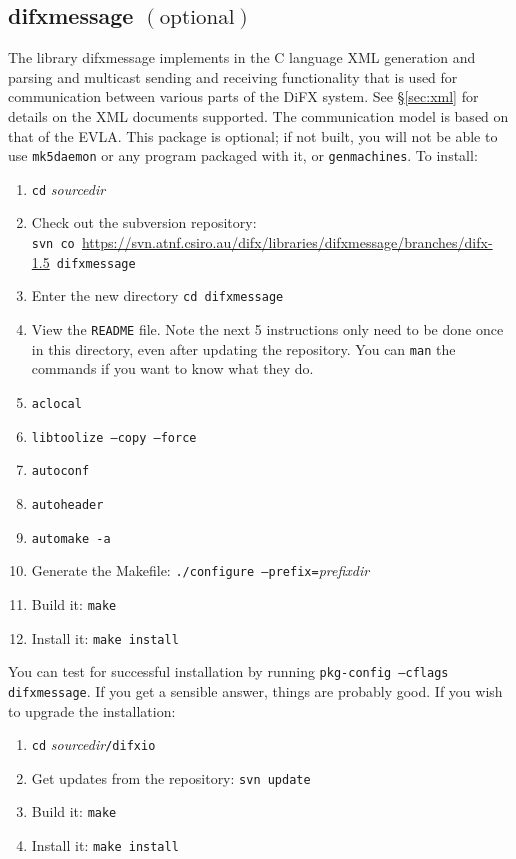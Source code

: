 
\subsection{difxmessage {\small $\mathrm{(optional)}$}} \label{sec:difxmessage}

\vspace{-20pt}\hspace{155pt}
\difxoneone

\vspace{7pt}

\noindent
The library difxmessage implements in the C language XML generation and parsing and multicast sending and receiving functionality that is used for communication between various parts of the DiFX system.
See \S\ref{sec:xml} for details on the XML documents supported.
The communication model is based on that of the EVLA.
This package is optional; if not built, you will not be able to use {\tt mk5daemon} or any program packaged with it, or {\tt genmachines}.
To install:
\begin{enumerate}
\item {\tt cd} {\em sourcedir}
\item Check out the subversion repository: \\
{\tt svn co }\url{https://svn.atnf.csiro.au/difx/libraries/difxmessage/branches/difx-1.5}{\tt\ difxmessage}
\item Enter the new directory {\tt cd difxmessage}
\item View the {\tt README} file.  
Note the next 5 instructions only need to be done once in this directory, even after updating the repository.
You can {\tt man} the commands if you want to know what they do.
\item {\tt aclocal}  
\item {\tt libtoolize --copy --force}
\item {\tt autoconf}
\item {\tt autoheader}
\item {\tt automake -a} 
\item Generate the Makefile: {\tt ./configure --prefix=}{\em prefixdir}
\item Build it: {\tt make}
\item Install it: {\tt make install}
\end{enumerate}

You can test for successful installation by running {\tt pkg-config --cflags difxmessage}.  
If you get a sensible answer, things are probably good.
If you wish to upgrade the installation:
\begin{enumerate}
\item {\tt cd} {\em sourcedir}{\tt /difxio}
\item Get updates from the repository: {\tt svn update}
\item Build it: {\tt make}
\item Install it: {\tt make install}
\end{enumerate}

